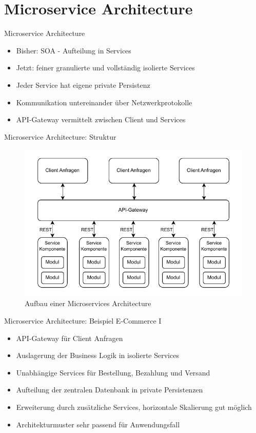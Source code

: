 \section{Microservice Architecture}

\begin{frame}{Microservice Architecture}
    \begin{itemize}
        \item Bisher: SOA - Aufteilung in Services
        \item Jetzt: feiner granulierte und vollständig isolierte Services
        \item Jeder Service hat eigene private Persistenz
        \item Kommunikation untereinander über Netzwerkprotokolle
        \item API-Gateway vermittelt zwischen Client und Services
    \end{itemize}
\end{frame}

\begin{frame}{Microservice Architecture: Struktur}
    \begin{figure}[!h]
        \centering
        \includegraphics[scale=0.6]{imglib/microservices/microservices}
        \caption{Aufbau einer Microservices Architecture}
        \label{fig:microservices}
    \end{figure}
\end{frame}

\begin{frame}{Microservice Architecture: Beispiel E-Commerce I}
    \begin{itemize}
        \item API-Gateway für Client Anfragen
        \item Auslagerung der Business Logik in isolierte Services
        \item Unabhängige Services für Bestellung, Bezahlung und Versand
        \item Aufteilung der zentralen Datenbank in private Persistenzen
        \item Erweiterung durch zusätzliche Services, horizontale Skalierung gut möglich
        \item Architekturmuster sehr passend für Anwendungsfall
    \end{itemize}
\end{frame}

